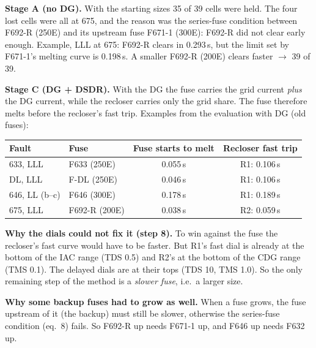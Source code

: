 \documentclass[11pt,a4paper]{article}
\newcommand{\sect}[1]{\bigskip{\Large\color{navy}\bfseries #1}\par\smallskip{\color{navy}\hrule height 0.8pt}\smallskip}
\begin{document}
\sect{3. Why --- what was failing}
\textbf{Stage A (no DG).} With the starting sizes 35 of 39 cells were held. The four lost cells were all at 675,
and the reason was the series-fuse condition between F692-R (250E) and its upstream fuse F671-1 (300E): F692-R did
not clear early enough. Example, LLL at 675: F692-R clears in 0.293\,s, but the limit set by F671-1's melting
curve is 0.198\,s. A smaller F692-R (200E) clears faster $\rightarrow$ 39 of 39.

\textbf{Stage C (DG + DSDR).} With the DG the fuse carries the grid current \emph{plus} the DG current, while the
recloser carries only the grid share. The fuse therefore melts before the recloser's fast trip. Examples from the
evaluation with DG (old fuses):

\begin{center}
\begin{tabular}{|l|l|c|c|}
\hline
\textbf{Fault} & \textbf{Fuse} & \textbf{Fuse starts to melt} & \textbf{Recloser fast trip} \\ \hline
633, LLL & F633 (250E) & 0.055\,s & R1: 0.106\,s \\ \hline
DL, LLL & F-DL (250E) & 0.046\,s & R1: 0.106\,s \\ \hline
646, LL (b--c) & F646 (300E) & 0.178\,s & R1: 0.189\,s \\ \hline
675, LLL & F692-R (200E) & 0.038\,s & R2: 0.059\,s \\ \hline
\end{tabular}
\end{center}

\textbf{Why the dials could not fix it (step 8).} To win against the fuse the recloser's fast curve would have to
be faster. But R1's fast dial is already at the bottom of the IAC range (TDS 0.5) and R2's at the bottom of the CDG
range (TMS 0.1). The delayed dials are at their tops (TDS 10, TMS 1.0). So the only remaining step of the method
is a \emph{slower fuse}, i.e.\ a larger size.

\textbf{Why some backup fuses had to grow as well.} When a fuse grows, the fuse upstream of it (the backup) must
still be slower, otherwise the series-fuse condition (eq.~8) fails. So F692-R up needs F671-1 up, and F646 up needs
F632 up.
\end{document}
